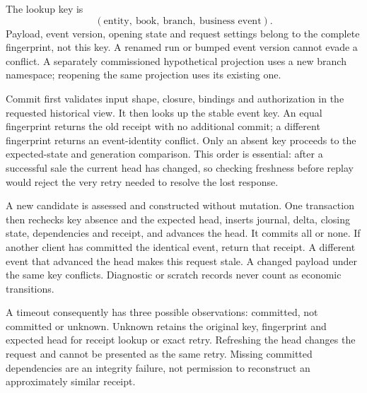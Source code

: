 The lookup key is
\[
  (\text{entity},\ \text{book},\ \text{branch},\ \text{business event}).
\]
Payload, event version, opening state and request settings belong to the complete
fingerprint, not this key. A renamed run or bumped event version cannot evade a
conflict. A separately commissioned hypothetical projection uses a new branch
namespace; reopening the same projection uses its existing one.

Commit first validates input shape, closure, bindings and authorization in the
requested historical view. It then looks up the stable event key. An equal
fingerprint returns the old receipt with no additional commit; a different
fingerprint returns an event-identity conflict. Only an absent key proceeds to
the expected-state and generation comparison. This order is essential: after
a successful sale the current head has changed, so checking freshness before
replay would reject the very retry needed to resolve the lost response.

A new candidate is assessed and constructed without mutation. One transaction
then rechecks key absence and the expected head, inserts journal, delta, closing
state, dependencies and receipt, and advances the head. It commits all or none.
If another client has committed the identical event, return that receipt. A
different event that advanced the head makes this request stale. A changed
payload under the same key conflicts. Diagnostic or scratch records never count
as economic transitions.

A timeout consequently has three possible observations: committed, not committed
or unknown. Unknown retains the original key, fingerprint and expected head for
receipt lookup or exact retry. Refreshing the head changes the request and cannot
be presented as the same retry. Missing committed dependencies are an integrity
failure, not permission to reconstruct an approximately similar receipt.

